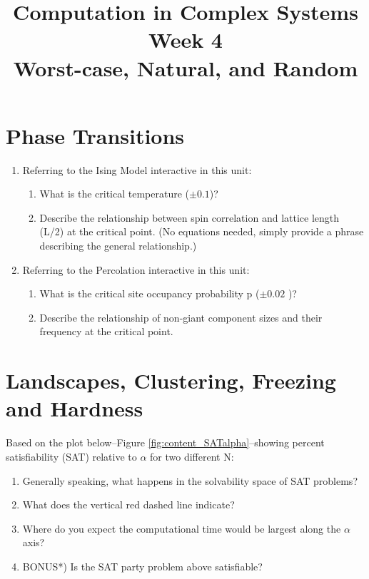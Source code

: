 \documentclass[]{article}
\title{Computation in Complex Systems\\
	Week 4\\Worst-case, Natural, and Random
	}
\begin{document}
\maketitle

\section{Phase Transitions}

\begin{enumerate}
	\item Referring to the Ising Model interactive in this unit:
	\begin{enumerate}
		\item What is the critical temperature ($\pm0.1$)?
		\item  Describe the relationship between spin correlation and lattice length (L/2) at the critical point. (No equations needed, simply provide a phrase describing the general relationship.)
	\end{enumerate}
	
	\item 	Referring to the Percolation interactive in this unit:
	\begin{enumerate}
		\item What is the critical site occupancy probability p ($\pm0.02$ )?
		
		\item Describe the relationship of non-giant component sizes and their frequency at the critical point.
	\end{enumerate}
\end{enumerate}


\section{Landscapes, Clustering, Freezing and Hardness}

Based on the plot below--Figure \ref{fig:content_SATalpha}--showing percent satisfiability (SAT) relative to $\alpha$ for two different N:

\begin{enumerate}
	\item  Generally speaking, what happens in the solvability space of SAT problems?

	\item  What does the vertical red dashed line indicate?

	\item   Where do you expect the computational time would be largest along the $\alpha$ axis?

	\item   BONUS*) Is the SAT party problem above satisfiable?
\end{enumerate}
\end{document}
